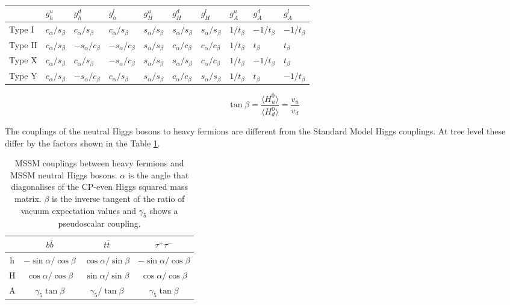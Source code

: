 \begin{table}[H]
    \centering
    \begin{tabular}{p{1.5cm}|x{1.2cm}x{1.2cm}x{1.2cm}x{1.2cm}x{1.2cm}x{1.2cm}x{1.2cm}x{1.2cm}x{1.2cm}}
         \hline
          & $g_{h}^{u}$ & $g_{h}^{d}$ & $g_{h}^{l}$ & $g_{H}^{u}$ & $g_{H}^{d}$ & $g_{H}^{l}$ & $g_{A}^{u}$ & $g_{A}^{d}$ & $g_{A}^{l}$ \\
         \hline
         \hline
         Type I & $c_{\alpha}/s_{\beta}$ & $c_{\alpha}/s_{\beta}$ & $c_{\alpha}/s_{\beta}$ & $s_{\alpha}/s_{\beta}$ & $s_{\alpha}/s_{\beta}$ & $s_{\alpha}/s_{\beta}$ & $1/t_{\beta}$ & $-1/t_{\beta}$ & $-1/t_{\beta}$ \\
         Type II & $c_{\alpha}/s_{\beta}$ & $-s_{\alpha}/c_{\beta}$ & $-s_{\alpha}/c_{\beta}$ & $s_{\alpha}/s_{\beta}$ & $c_{\alpha}/c_{\beta}$ & $c_{\alpha}/c_{\beta}$ & $1/t_{\beta}$ & $t_{\beta}$ & $t_{\beta}$ \\
         Type X & $c_{\alpha}/s_{\beta}$ & $c_{\alpha}/s_{\beta}$ & $-s_{\alpha}/c_{\beta}$ & $s_{\alpha}/s_{\beta}$ & $s_{\alpha}/s_{\beta}$ & $c_{\alpha}/c_{\beta}$ & $1/t_{\beta}$ & $-1/t_{\beta}$ & $t_{\beta}$ \\
         Type Y & $c_{\alpha}/s_{\beta}$ & $-s_{\alpha}/c_{\beta}$ & $c_{\alpha}/s_{\beta}$ & $s_{\alpha}/s_{\beta}$ & $c_{\alpha}/c_{\beta}$ & $s_{\alpha}/s_{\beta}$ & $1/t_{\beta}$ & $t_{\beta}$ & $-1/t_{\beta}$ \\
         \hline
    \end{tabular}
    \caption{}
\end{table}

\begin{equation}
\tan \beta = \frac{\langle H_{u}^{0} \rangle}{\langle H_{d}^{0} \rangle} = \frac{v_{u}}{v_{d}}
\end{equation}

The couplings of the neutral Higgs bosons to heavy fermions are different from the Standard Model Higgs couplings. At tree level these differ by the factors shown in the Table \ref{tab:mssm_couplings}.

\begin{table}[H]
\centering
\begin{tabular}{c || c c c}
\hline
  & $b\bar{b}$ & $t\bar{t}$ & $\tau^+ \tau^-$ \\
\hline
\hline
h & $-\sin\alpha / \cos\beta$ & $\cos\alpha / \sin\beta$ & $-\sin\alpha / \cos\beta$\\
H & $\cos\alpha / \cos\beta$ & $\sin\alpha / \sin\beta$ & $\cos\alpha / \cos\beta$ \\
A & $\gamma_{5}\tan\beta $ & $\gamma_{5}/\tan\beta$ & $\gamma_{5}\tan\beta$ \\
\hline
\end{tabular}
\caption{MSSM couplings between heavy fermions and MSSM neutral Higgs bosons. $\alpha$ is the angle that diagonalises of the CP-even Higgs squared mass matrix. $\beta$ is the inverse tangent of the ratio of vacuum expectation values and $\gamma_5$ shows a pseudoscalar coupling.}
\label{tab:mssm_couplings}
\end{table}

